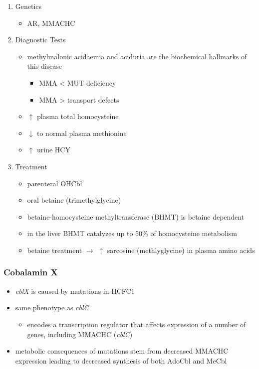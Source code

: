 \documentclass{scrartcl}
\begin{document}
\begin{enumerate}
\item Genetics
\label{sec:orge7c7d29}
\begin{itemize}
\item AR, MMACHC
\end{itemize}

\item Diagnostic Tests
\label{sec:org5cd31b5}
\begin{itemize}
\item methylmalonic acidaemia and aciduria are the
biochemical hallmarks of this disease
\begin{itemize}
\item MMA \textless{} MUT deficiency
\item MMA \textgreater{} transport defects
\end{itemize}
\item \(\uparrow\) plasma total homocysteine
\item \(\downarrow\) to normal plasma methionine
\item \(\uparrow\) urine HCY
\end{itemize}

\item Treatment
\label{sec:org5187321}
\begin{itemize}
\item parenteral OHCbl
\item oral betaine (trimethylglycine)
\item betaine-homocysteine methyltransferase (BHMT) is betaine dependent
\end{itemize}
\begin{itemize}
\item in the liver BHMT catalyzes up to 50\% of homocysteine metabolism
\item betaine treatment \(\to\) \(\uparrow\) sarcosine (methlyglycine) in plasma amino acids
\end{itemize}
\end{enumerate}

\subsubsection{Cobalamin X}
\label{sec:orga545dfa}
\begin{itemize}
\item \emph{cblX} is caused by mutations in HCFC1
\item same phenotype as \emph{cblC}
\begin{itemize}
\item encodes a transcription regulator that affects expression of a
number of genes, including MMACHC (\emph{cblC})
\end{itemize}
\item metabolic consequences of mutations stem from decreased MMACHC
expression leading to decreased synthesis of both AdoCbl and MeCbl
\end{itemize}
\end{document}
